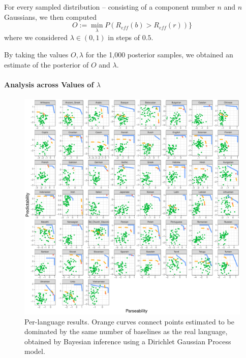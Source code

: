 \documentclass[10pt,twoside,lineno]{article}
\begin{document}
For every sampled distribution -- consisting of a component number $n$ and $n$ Gaussians, we then computed 
\begin{equation}
	O := \min_\lambda P(R_{eff}(b) > R_{eff}(r))\}
\end{equation}
where we considered $\lambda \in (0,1)$ in steps of $0.5$.

By taking the values $O, \lambda$ for the 1,000 posterior samples, we obtained an estimate of the posterior of $O$ and $\lambda$.

\paragraph{Analysis across Values of $\lambda$}





\begin{figure}
\centering
\includegraphics[width=\textwidth]{../results/plane/pareto-plane-perLanguage-isoCurve.pdf}
\caption{Per-language results. Orange curves connect points estimated to be dominated by the same number of baselines as the real language, obtained by Bayesian inference using a Dirichlet Gaussian Process model.}
\end{figure}
\end{document}
